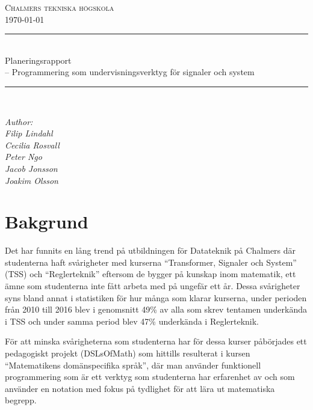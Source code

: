 \documentclass{article}
\begin{document}
\begin{titlepage} \newcommand{\HRule}{\rule{\linewidth}{0.3mm}}
\center
\textsc{\Large Chalmers tekniska högskola}\\[0.05cm] %
\normalsize \today

\HRule \\[0.08cm]
{ \large Planeringsrapport \\ \normalsize{-- Programmering som undervisningsverktyg för signaler och system}}\\[0.08cm] %
\HRule \\[0.3cm]

\vfill

\begin{flushleft} \small
    \emph{Author: \\
    \quad Filip Lindahl\\
    \quad Cecilia Rosvall\\
    \quad Peter Ngo\\
    \quad Jacob Jonsson\\
    \quad Joakim Olsson\\}
\end{flushleft}
\end{titlepage}
\newpage

\section{Bakgrund}
Det har funnits en lång trend på utbildningen för Datateknik på
Chalmers där studenterna haft svårigheter med kurserna “Transformer,
Signaler och System” (TSS) och “Reglerteknik”
eftersom de bygger på kunskap inom matematik, ett ämne som studenterna
inte fått arbeta med på ungefär ett år.
%
Dessa svårigheter syns bland annat i statistiken för hur många som
klarar kurserna, under perioden från 2010 till 2016 blev i genomsnitt
49\% av alla som skrev tentamen underkända i TSS och under samma
period blev 47\% underkända i Reglerteknik.

För att minska svårigheterna som studenterna har för dessa kurser
påbörjades ett pedagogiskt projekt (DSLsOfMath) som hittills
resulterat i kursen “Matematikens domänspecifika språk”, där man
använder funktionell programmering som är ett verktyg som
studenterna har erfarenhet av och som använder en notation med
fokus på tydlighet för att lära ut matematiska begrepp.
\end{document}
